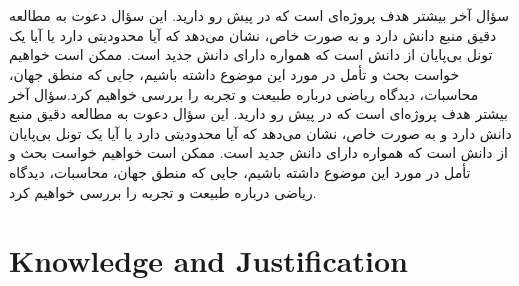\documentclass[10pt,a4paper]{article}
\begin{document}
            \\
            \\
            \indent سؤال آخر بیشتر هدف پروژه‌ای است که در پیش رو دارید. این سؤال دعوت به مطالعه دقیق منبع دانش دارد و به صورت خاص، نشان می‌دهد که آیا محدودیتی دارد یا آیا یک تونل بی‌پایان از دانش است که همواره دارای دانش جدید است. ممکن است خواهیم خواست بحث و تأمل در مورد این موضوع داشته باشیم، جایی که منطق جهان، محاسبات، دیدگاه ریاضی درباره طبیعت و تجربه را بررسی خواهیم کرد.سؤال آخر بیشتر هدف پروژه‌ای است که در پیش رو دارید. این سؤال دعوت به مطالعه دقیق منبع دانش دارد و به صورت خاص، نشان می‌دهد که آیا محدودیتی دارد یا آیا یک تونل بی‌پایان از دانش است که همواره دارای دانش جدید است. ممکن است خواهیم خواست بحث و تأمل در مورد این موضوع داشته باشیم، جایی که منطق جهان، محاسبات، دیدگاه ریاضی درباره طبیعت و تجربه را بررسی خواهیم کرد.
        
        \section{Knowledge and Justification}
\end{document}
